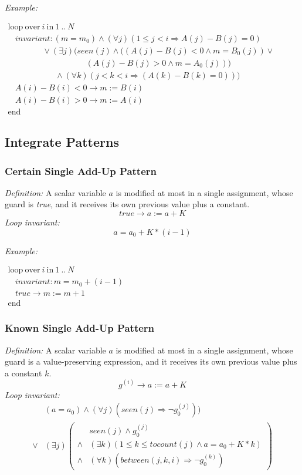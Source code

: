\documentclass[a4paper,10pt]{article}
\newcommand{\idx}{\ensuremath{i}\xspace}
\newcommand{\at}[1]{{(#1)}}
\newcommand{\KWloop}{\ensuremath{\mathrm{loop}~}}
\newcommand{\KWend}{\ensuremath{\mathrm{end}~}}
\newcommand{\KWover}{\ensuremath{\mathrm{over}~}}
\newcommand{\KWin}{\ensuremath{~\mathrm{in}~}}
\newcommand{\impl}{\ensuremath{\Longrightarrow}}
\newcommand{\seen}[1]{\ensuremath{\mathit{seen}(#1)}\xspace}
\newcommand{\tocount}[1]{\ensuremath{\mathit{tocount}(#1)}\xspace}
\newcommand{\between}[3]{\ensuremath{\mathit{between}{(#1,#2,#3)}}\xspace}
\newcommand{\loopinvariant}{\noindent\textit{Loop invariant:}\xspace}
\newcommand{\patterndef}{\noindent\textit{Definition:}\xspace}
\newcommand{\patternexample}{\noindent\textit{Example:}\xspace}
\begin{document}
\bigskip
\patternexample

\medskip
$\begin{array}{l}
  \KWloop \KWover i \KWin 1~..~N \\
  ~~~~ \textit{invariant}: (m = m_0) \land (\forall j)(1\leq j < i \impl A(j)-B(j)=0)\\
  ~~~~~~~~~~~~~~~~~~~ \lor (\exists j)(\seen{j} \land ((A(j)-B(j) < 0 \land m = B_0(j)) \lor\\
  ~~~~~~~~~~~~~~~~~~~~~~~~~~~~~~~~~~~~~~~~~~~ (A(j)-B(j) > 0 \land m = A_0(j)))\\
  ~~~~~~~~~~~~~~~~~~~~~~~~~~ \land (\forall k)(j < k < i \impl (A(k)-B(k) = 0)))\\
  ~~~~ A(i)-B(i) < 0 \rightarrow m := B(i)\\
  ~~~~ A(i)-B(i) > 0 \rightarrow m := A(i)\\
  \KWend
\end{array}$

\subsection{Integrate Patterns}

\subsubsection*{Certain Single Add-Up Pattern}

\patterndef A scalar variable $a$ is modified at most in a single assignment, whose
guard is \textit{true}, and it receives its own previous value plus a constant.
%
$$\mathit{true} \rightarrow a := a + K$$
%
\loopinvariant
%
$$a = a_0 + K * (i-1)$$

\bigskip
\patternexample

\medskip
$\begin{array}{l}
  \KWloop \KWover i \KWin 1~..~N \\
  ~~~~ \textit{invariant}: m = m_0 + (i-1)\\
  ~~~~ true \rightarrow m := m+1\\
  \KWend
\end{array}$

\subsubsection*{Known Single Add-Up Pattern}

\patterndef A scalar variable $a$ is modified at most in a single assignment, whose
guard is a value-preserving expression, and it receives its own previous value plus a constant $k$.
%
$$g^\at{\idx} \rightarrow a := a + K$$
%
\loopinvariant
%
\begin{eqnarray*}
&(a = a_0) \land (\forall j)(\seen{j} \impl \neg g_0^\at{j})) \\
\lor 
& (\exists j)
\left(\begin{array}{cl}
&\seen{j} \land g_0^\at{j}\\
 \land& (\exists k)(1 \leq k \leq \tocount{j} \land a = a_0 + K * k) \\
\land& (\forall k)(\between{j}{k}{\idx} \impl \neg g_0^\at{k})
\end{array}\right)
\end{eqnarray*}
\end{document}

